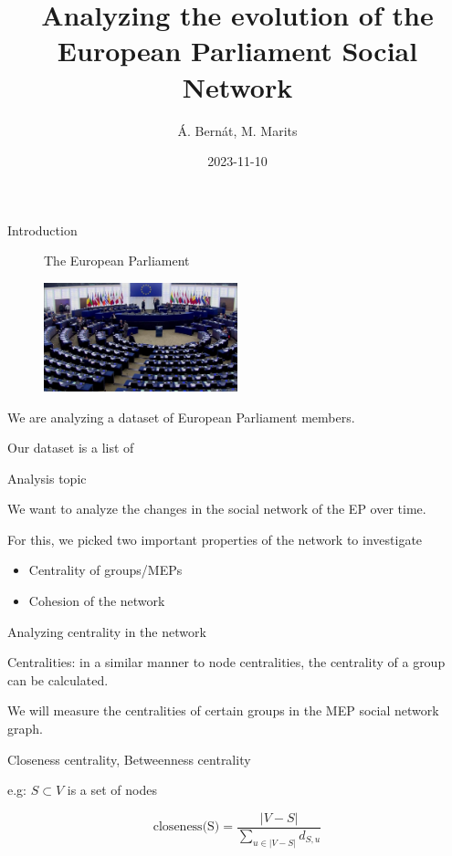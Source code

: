 \documentclass{beamer}
\title{Analyzing the evolution of the European Parliament Social Network}
\date{2023-11-10}
\author{Á. Bernát, M. Marits}
\begin{document}
\begin{frame}[plain]
    \maketitle
\end{frame}

\begin{frame}{Introduction}
	
	\begin{figure}
		The European Parliament
	
		\includegraphics[width=0.5\textwidth]{img/euparl.jpg}
	\end{figure}

	We are analyzing a dataset of European Parliament members.
	
	\vspace{2mm}
	
	Our dataset is a list of 

	
\end{frame}

\begin{frame}{Analysis topic}
	
	We want to analyze the changes in the social network of the EP over time.
	
	\vspace{2mm}
	
	\pause For this, we picked two important properties of the network to investigate\begin{itemize}
		\pause \item Centrality of groups/MEPs
		
		\pause \item Cohesion of the network
	\end{itemize}
	
\end{frame}

\begin{frame}{Analyzing centrality in the network}
	
	Centralities: in a similar manner to node centralities, the centrality of a group can be calculated. 
	
	\vspace{2mm}
	
	\pause We will measure the centralities of certain groups in the MEP social network graph. 
	
	\vspace{2mm}
	
	\pause Closeness centrality, Betweenness centrality
	
	\vspace{2mm} e.g: $S \subset V$ is a set of nodes 
	
	\pause \[
		\text{closeness(S)} = \frac{|V-S|}{\sum_{u \in |V-S|}d_{S,u} }
	\]
	
\end{frame}
\end{document}
